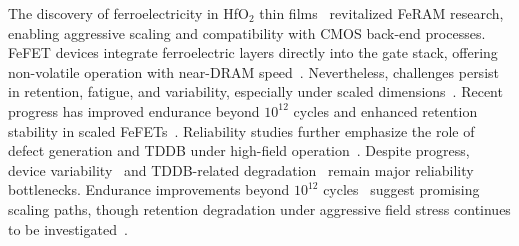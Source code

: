 The discovery of ferroelectricity in HfO$_2$ thin films~\cite{boscke2011} revitalized FeRAM research, enabling aggressive scaling and compatibility with CMOS back-end processes. 
FeFET devices integrate ferroelectric layers directly into the gate stack, offering non-volatile operation with near-DRAM speed~\cite{mueller2012}. 
Nevertheless, challenges persist in retention, fatigue, and variability, especially under scaled dimensions~\cite{schenk2015, kim2020_fefet}. 
Recent progress has improved endurance beyond $10^{12}$ cycles and enhanced retention stability in scaled FeFETs~\cite{li2022}. 
Reliability studies further emphasize the role of defect generation and TDDB under high-field operation~\cite{park2019_tddb}.
Despite progress, device variability~\cite{kim2020_fefet} and TDDB-related degradation~\cite{park2019_tddb} 
remain major reliability bottlenecks. 
Endurance improvements beyond $10^{12}$ cycles~\cite{li2022} suggest promising scaling paths, 
though retention degradation under aggressive field stress continues to be investigated~\cite{schenk2015}.
